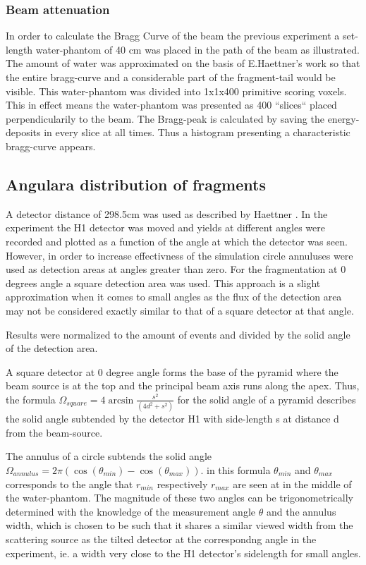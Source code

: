 \subsubsection{Beam attenuation}

In order to calculate the Bragg Curve of the beam the previous experiment a set-length water-phantom of 40 cm was placed in the path of the beam as illustrated. The amount of water was approximated on the basis of E.Haettner's work so that the entire bragg-curve and a considerable part of the fragment-tail would be visible. This water-phantom was divided into 1x1x400 primitive scoring voxels. This in effect means the water-phantom was presented as 400 ``slices`` placed perpendicularily to the beam. The Bragg-peak is calculated by saving the energy-deposits in every slice at all times. Thus a histogram presenting a characteristic bragg-curve appears.

\subsection{Angulara distribution of fragments\label{AngularDistributionText}}


A detector distance of 298.5cm was used as described by Haettner \cite[fig 5.1]{ehaettner} . In the experiment the H1 detector was moved and yields at different angles were recorded and plotted as a function of the angle at which the detector was seen. However, in order to increase effectivness of the simulation circle annuluses were used as detection areas at angles greater than zero. For the fragmentation at 0 degrees angle a square detection area was used. This approach is a slight approximation when it comes to small angles as the flux of the detection area may not be considered exactly similar to that of a square detector at that angle.

Results were normalized to the amount of events and divided by the solid angle of the detection area.

A square detector at 0 degree angle forms the base of the pyramid where the beam source is at the top and the principal beam axis runs along the apex. Thus, the formula $\Omega_{square} = 4 \arcsin{\frac{s^2}{(4d^2+s^2)}}$ for the solid angle of a pyramid describes the solid angle subtended by the detector H1 with side-length s at distance d from the beam-source.

The annulus of a circle subtends the solid angle $\Omega_{annulus} = 2 \pi (\cos(\theta_{min}) - \cos(\theta_{max}))$. in this formula $\theta_{min}$ and $\theta_{max}$ corresponds to the angle that $r_{min}$ respectively $r_{max}$ are seen at in the middle of the water-phantom. The magnitude of these two angles can be trigonometrically determined with the knowledge of the measurement angle $\theta$ and the annulus width, which is chosen to be such that it shares a similar viewed width from the scattering source as the tilted detector at the correspondng angle in the experiment, ie. a width very close to the H1 detector's sidelength for small angles.





